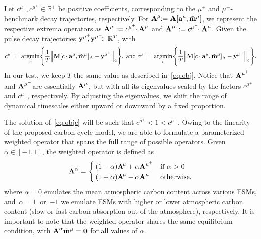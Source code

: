 \documentclass[11pt, a4paper, pdftex, twoside, dvipsnames]{article}
\newcommand{\bb}[1]{\boldsymbol{\bold{#1}}}
\newcommand{\bbt}[1]{\tilde{\boldsymbol{\mathrm{#1}}}}
\newcommand{\argmin}[1]{\underset{#1}{\text{argmin}} }
\begin{document}
Let $c^{\mu^-}\!\!\!, c^{\mu^+}\!\!\! \in \mathbb{R}^+$ be positive coefficients, corresponding to the $\mu^+$ and $\mu^-$-benchmark decay trajectories, respectively.
%
For $\bb{A}^{\mu}\!\!:=\bb{A}[\bb{a}^\mu,\bbt{m}^\mu]$, we represent the respective extrema operators  as $\bb{A}^{\mu^+}\!\!\!:= c^{\mu^+}\!\! \cdot \bb{A}^{\mu}$ and $\bb{A}^{\mu^-}\!\!\!:= c^{\mu^-}\!\! \cdot \bb{A}^{\mu}$.
%
Given the pulse decay trajectories $\bb{y}^{\mu^+}\!\!\!, \bb{y}^{\mu^-}\!\!\!  \in \mathbb{R}^T$,  with
%
\begin{align}\label{eq:objc}
  c^{\mu^+} \!= \argmin{c} \Bigg\{  \frac{1}{T}  \Big \| \bb{M}[c \cdot \bb{a}^\mu, \bbt{m}^{\mu}]_\text{A} - \bb{y}^{\mu^+} \Big \|_2  \Bigg\},\; \text{and} \; 
  c^{\mu^-} \!= \argmin{c} \Bigg\{  \frac{1}{T} \Big \| \bb{M}[c \cdot \bb{a}^\mu, \bbt{m}^{\mu}]_\text{A} - \bb{y}^{\mu^-} \Big \|_2  \Bigg\}.
\end{align}
%
In our test, we keep $T$ the same value as described in~\eqref{eq:obj}.
%
Notice that $\bb{A}^{\mu^+}\!\!$ and $\bb{A}^{\mu^-}\!\!$ are essentially $\bb{A}^{\mu}$, but with all its eigenvalues scaled by the factors $c^{\mu^+}\!\!$ and $c^{\mu^-}\!\!$, respectively.
%
By adjusting the eigenvalues, we shift the range of dynamical timescales either upward or downward by a fixed proportion.


The solution of~\eqref{eq:objc} will be such that $c^{\mu^+} <1<c^{\mu^-}$. 
%
Owing to the linearity of the proposed carbon-cycle model, we are able to formulate a parameterized weighted operator that spans the full range of possible operators.
%
Given $\alpha \in [-1,1]$, the weighted operator is defined as 
%
\begin{align}
	\bb{A}^{\alpha} = 
	\begin{cases}
		(1-\alpha)\bb{A}^{\!\mu}  +  \alpha \bb{A}^{\mu^+}   & \text{if $\alpha>0$ } \\
		(1+\alpha)\bb{A}^{\!\mu}  -  \alpha \bb{A}^{\mu^-}   & \text{otherwise},
	\end{cases}
\end{align}
%
where $\alpha=0$ emulates the mean atmospheric carbon content across various ESMs, and~$\alpha=1$~or~$-1$ we emulate ESMs with higher or lower atmospheric carbon content (slow or fast carbon absorption out of the atmosphere), respectively.
%
It is important to note that the weighted operator shares the same equilibrium condition, with $\bb{A}^{\alpha} \bbt{m}^{\mu}=\bb{0}$ for all values of $\alpha$.
%


\end{document}
